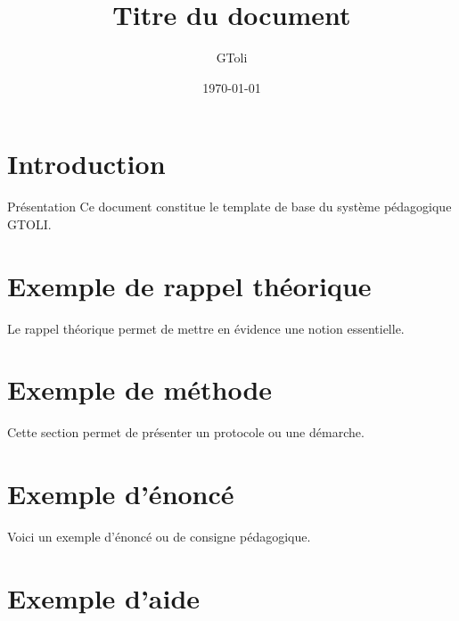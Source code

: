 \documentclass[11pt,a4paper]{article}
\title{\textbf{Titre du document}}
\author{GToli}
\date{\today}
\begin{document}
\maketitle

\section{Introduction}

\begin{cadrebleu}{Présentation}
Ce document constitue le template de base du système pédagogique GTOLI.
\end{cadrebleu}

\section{Exemple de rappel théorique}

\begin{cadretheorie}
Le rappel théorique permet de mettre en évidence une notion essentielle.
\end{cadretheorie}

\section{Exemple de méthode}

\begin{cadremethode}
Cette section permet de présenter un protocole ou une démarche.
\end{cadremethode}

\section{Exemple d’énoncé}

\begin{cadreenonce}
Voici un exemple d’énoncé ou de consigne pédagogique.
\end{cadreenonce}

\section{Exemple d’aide}
\end{document}
